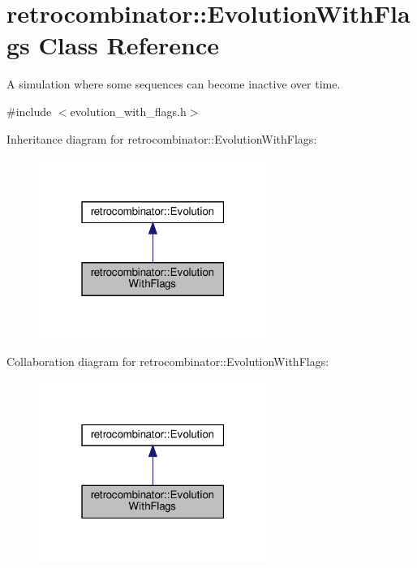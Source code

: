 \hypertarget{classretrocombinator_1_1EvolutionWithFlags}{}\section{retrocombinator\+:\+:Evolution\+With\+Flags Class Reference}
\label{classretrocombinator_1_1EvolutionWithFlags}


A simulation where some sequences can become inactive over time.  




{\ttfamily \#include $<$evolution\+\_\+with\+\_\+flags.\+h$>$}



Inheritance diagram for retrocombinator\+:\+:Evolution\+With\+Flags\+:
\nopagebreak
\begin{figure}[H]
\begin{center}
\leavevmode
\includegraphics[width=211pt]{classretrocombinator_1_1EvolutionWithFlags__inherit__graph}
\end{center}
\end{figure}


Collaboration diagram for retrocombinator\+:\+:Evolution\+With\+Flags\+:
\nopagebreak
\begin{figure}[H]
\begin{center}
\leavevmode
\includegraphics[width=211pt]{classretrocombinator_1_1EvolutionWithFlags__coll__graph}
\end{center}
\end{figure}

